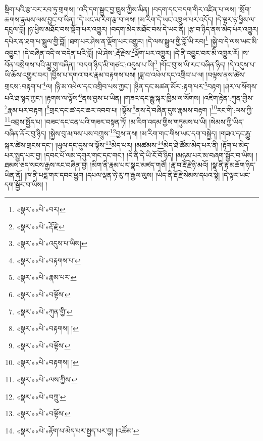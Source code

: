 སྡིག་པའི་རྩ་བར་རབ་ཏུ་གྲགས། །འདི་དག་སྦྱང་བྱ་ཁྲུས་ཀྱིས་མིན། །བདག་དང་བདག་གིར་འཛིན་པ་ལས། །སྲོག་ཆགས་རྣམས་ལས་བྱུང་བ་ཡིན། །དེ་ཡང་མ་རིག་རྩ་བ་ལས། །མ་རིག་དེ་ཡང་འཁྲུལ་པར་འདོད། །དེ་ལྟར་ཉ་ཕྱིས་ལ་དངུལ་བློ། །ཉ་ཕྱིས་མཐོང་བས་ལྡོག་པར་འགྱུར། །བདག་མེད་མཐོང་བས་དེ་ཡང་ནི། །རྩ་བ་ཉིད་ནས་མེད་པར་འགྱུར། དཔེར་ན་ཐག་པ་སྦྲུལ་གྱི་བློ། །ཐག་པར་ཤེས་ན་ལྡོག་པར་འགྱུར། །དེ་ལས་སྦྲུལ་གྱི་བློ་ཡི་རབ།\footnote{«སྣར་»«པེ་»བར།} །སྐྱེ་བ་དེ་ལས་ཡང་མི་འབྱུང་། །དེ་བཞིན་འདི་ལ་བདེན་པའི་བློ། །ཡེ་ཤེས་:རྡོ་རྗེས་\footnote{«སྣར་»«པེ་»རྡོ་རྗེ་}ལྡོག་པར་འགྱུར། །དེ་ནི་འབྱུང་བར་མི་འགྱུར་རོ། །ས་བོན་བསྲེགས་པའི་མྱུ་གུ་བཞིན། །བདག་ཉིད་མི་གཙང་:འདུས་པ་ཡི།\footnote{«སྣར་»«པེ་»འདུས་པ་ཡིས།} །གོང་བུ་ས་ཡི་རང་བཞིན་ཉིད། །དེ་འདུས་པ་ཡི་ཆོས་འགྱུར་བར། །བྱིས་པ་དགའ་བར་རྣམ་བརྟགས་པས། །ཟླ་བ་འཕེལ་དང་འགྲིབ་པ་ལ། །བལྟས་ནས་ཚེས་གྲངས་:བརྟག་པ་\footnote{«སྣར་»«པེ་»བརྟགས་པ་}ལ། །ཉི་མ་འཕེལ་དང་འགྲིབ་པས་ཀྱང་། །ཉིན་དང་མཚན་མོར་:རྟག་པར་\footnote{«སྣར་»«པེ་»རྣམ་པར་}བརྟག །ཤར་ལ་སོགས་པའི་ཐ་སྙད་ཀྱང་། །རྟགས་ལ་ལྟོས་\footnote{«སྣར་»«པེ་»བལྟོས་}ནས་བྱས་པ་ཡིན། །གཟའ་དང་རྒྱུ་སྐར་ཁྱིམ་ལ་སོགས། །འཇིག་རྟེན་:ཀུན་གྱིས་\footnote{«སྣར་»«པེ་»ཀུན་གྱི་}རྣམ་པར་བརྟག །\footnote{«སྣར་»«པེ་»བརྟགས། །}གྲང་དང་ཚ་དང་ཆར་འབབ་པ། །ལྟོས་\footnote{«སྣར་»«པེ་»བལྟོས་}ནས་དེ་བཞིན་དུས་རྣམས་བརྟག །\footnote{«སྣར་»«པེ་»བརྟགས། །}རང་གི་:ལས་ཀྱི་\footnote{«སྣར་»«པེ་»ལས་ཀྱིས་}འབྲས་སྤྱོད་པ། །བཟང་དང་ངན་པའི་གཟར་བསྟན་ཏོ། །མ་རིག་འདམ་གྱིས་གཏུམས་པ་ཡི། །སེམས་ཀྱི་ཡིད་བཞིན་ནོར་བུ་ཉིད། །སྐྱེས་བུ་མཁས་པས་བཀྲུས་\footnote{«སྣར་»«པེ་»བཀྲུ་}བྱས་ནས། །མ་རིག་གང་གིས་ཡང་དག་བསྐྱེད། །གཟའ་དང་རྒྱུ་སྐར་ཚེས་གྲངས་དང་། །ཡུལ་དང་དུས་ལ་ལྟོས་\footnote{«སྣར་»«པེ་»བལྟོས་}མེད་པར། །མཚམས་\footnote{«སྣར་»«པེ་»རྟོག་པ་མེད་པར་སྤྱད་པར་བྱ། །འཚོམ་}མེད་ཐེ་ཚོམ་མེད་པར་ནི། །རྟོག་པ་མེད་པར་སྤྱད་པར་བྱ། །དབང་པོ་ལམ་དགུར་གང་དང་གང་། །དེ་ནི་དེ་ཡི་ངོ་བོ་ཉིད། །མཉམ་པར་མ་བཞག་སྦྱོར་བ་ཡིས། །ཐམས་ཅད་སངས་རྒྱས་རང་བཞིན་བྱ། །མིག་ནི་རྣམ་པར་སྣང་མཛད་གཙོ། །རྣ་བ་རྡོ་རྗེ་ཉི་མའོ། །སྣ་ནི་རྟ་མཆོག་ཉིད་ཡིན་ནོ། །ཁ་ནི་པདྨ་གར་དབང་ཕྱུག །དཔལ་ལྡན་ཧེ་རུ་ཀ་རྒྱལ་ལུས། །ཡིད་ནི་རྡོ་རྗེ་སེམས་དཔའ་སྟེ། །དེ་ལྟར་ཡང་དག་སྦྱོར་བ་ཡིས། །
